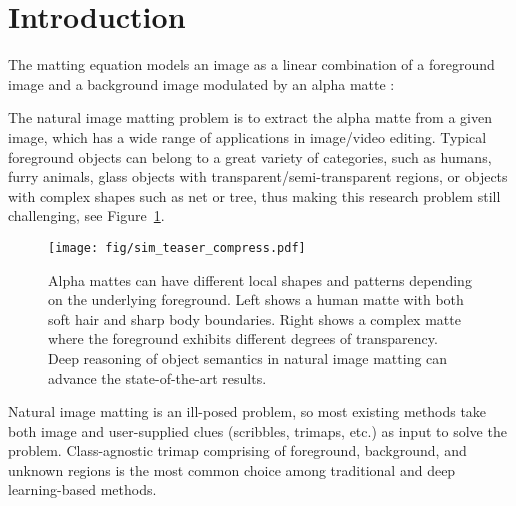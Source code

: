 \documentclass[10pt,twocolumn,letterpaper]{article}
\begin{document}
\vspace{-10pt}
\section{Introduction}
The matting equation models an image  as a linear combination of a foreground image  and a background image  modulated by an alpha matte :
 
The natural image matting problem is to extract the alpha matte  from a given image, which has  a wide range of applications in image/video editing.
Typical foreground objects can belong to a great variety of categories, such as humans, furry animals, glass objects with transparent/semi-transparent regions, or objects with complex shapes such as net or tree, thus making this research problem still challenging, see Figure~\ref{fig:teaser_image}.


\begin{figure}[t]
\centering 
\texttt{[image: fig/sim\_teaser\_compress.pdf]} 
\caption{Alpha mattes can have different local shapes and patterns depending on the underlying foreground. Left shows a human matte with both soft hair and sharp body boundaries. Right shows a complex matte where the foreground  exhibits different degrees of transparency. Deep reasoning of object semantics in natural image matting can advance the state-of-the-art results.}
\label{fig:teaser_image}
\vspace{-14pt}
\end{figure}


Natural image matting is an ill-posed problem, so most existing methods take both image and user-supplied clues (scribbles, trimaps, etc.) as input to solve the problem. Class-agnostic trimap comprising of foreground, background, and unknown regions is the most common choice among traditional and deep learning-based methods.
\end{document}
